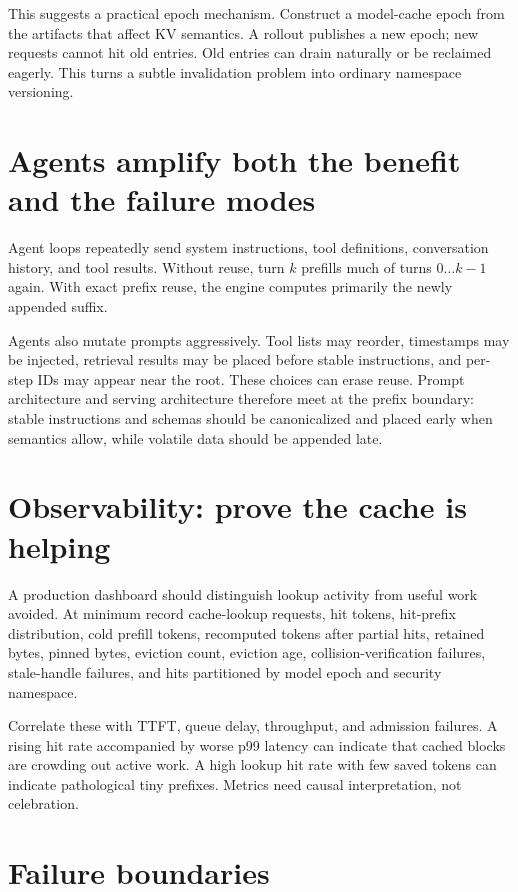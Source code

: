 This suggests a practical epoch mechanism. Construct a model-cache epoch from the
artifacts that affect KV semantics. A rollout publishes a new epoch; new requests
cannot hit old entries. Old entries can drain naturally or be reclaimed eagerly.
This turns a subtle invalidation problem into ordinary namespace versioning.

\section{Agents amplify both the benefit and the failure modes}

Agent loops repeatedly send system instructions, tool definitions, conversation
history, and tool results. Without reuse, turn $k$ prefills much of turns
$0\ldots k-1$ again. With exact prefix reuse, the engine computes primarily the newly
appended suffix.

Agents also mutate prompts aggressively. Tool lists may reorder, timestamps may be
injected, retrieval results may be placed before stable instructions, and per-step
IDs may appear near the root. These choices can erase reuse. Prompt architecture and
serving architecture therefore meet at the prefix boundary: stable instructions and
schemas should be canonicalized and placed early when semantics allow, while volatile
data should be appended late.

\section{Observability: prove the cache is helping}

A production dashboard should distinguish lookup activity from useful work avoided.
At minimum record cache-lookup requests, hit tokens, hit-prefix distribution, cold
prefill tokens, recomputed tokens after partial hits, retained bytes, pinned bytes,
eviction count, eviction age, collision-verification failures, stale-handle failures,
and hits partitioned by model epoch and security namespace.

Correlate these with TTFT, queue delay, throughput, and admission failures. A rising
hit rate accompanied by worse p99 latency can indicate that cached blocks are
crowding out active work. A high lookup hit rate with few saved tokens can indicate
pathological tiny prefixes. Metrics need causal interpretation, not celebration.

\section{Failure boundaries}

